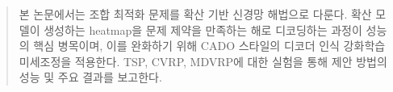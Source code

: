 \begin{abstract}
본 논문에서는 조합 최적화 문제를 확산 기반 신경망 해법으로 다룬다.
확산 모델이 생성하는 heatmap을 문제 제약을 만족하는 해로 디코딩하는 과정이 성능의 핵심 병목이며, 이를 완화하기 위해 CADO 스타일의 디코더 인식 강화학습 미세조정을 적용한다.
TSP, CVRP, MDVRP에 대한 실험을 통해 제안 방법의 성능 및 주요 결과를 보고한다.
\end{abstract}
